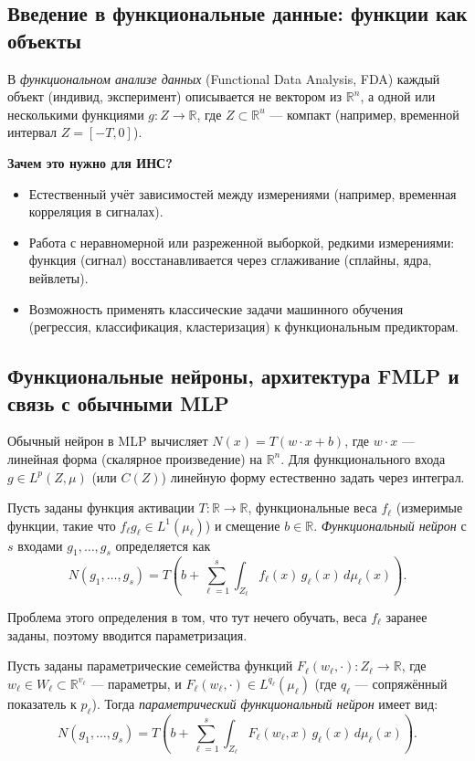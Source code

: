 \documentclass[../NDCNNAI_main.tex]{subfiles}
\begin{document}
	\subsection{Введение в функциональные данные: функции как объекты}
	
	В \emph{функциональном анализе данных} (Functional Data Analysis, FDA) каждый объект (индивид, эксперимент) описывается не вектором из $\mathbb{R}^n$, а одной или несколькими функциями $g\colon Z \to \mathbb{R}$, где $Z \subset \mathbb{R}^u$ --- компакт (например, временной интервал $Z = [-T, 0]$).
	
	\textbf{Зачем это нужно для ИНС?}
	\begin{itemize}
		\item Естественный учёт зависимостей между измерениями (например, временная корреляция в сигналах).
		\item Работа с неравномерной или разреженной выборкой, редкими измерениями: функция (сигнал) восстанавливается через сглаживание (сплайны, ядра, вейвлеты).
		\item Возможность применять классические задачи машинного обучения (регрессия, классификация, кластеризация) к функциональным предикторам.
	\end{itemize}
	
	
	\subsection{Функциональные нейроны, архитектура FMLP и связь с обычными MLP}
	
	Обычный нейрон в MLP вычисляет $N(x) = T(w \cdot x + b)$, где $w \cdot x$ --- линейная форма (скалярное произведение) на $\mathbb{R}^n$. Для функционального входа $g \in L^p(Z, \mu)$ (или $C(Z)$) линейную форму естественно задать через интеграл.
	
	\begin{definition}
		Пусть заданы функция активации $T\colon \mathbb{R} \to \mathbb{R}$, функциональные веса $f_\ell$ (измеримые функции, такие что $f_\ell g_\ell \in L^1(\mu_\ell)$) и смещение $b \in \mathbb{R}$. \emph{Функциональный нейрон} с $s$ входами $g_1,\dots,g_s$ определяется как
		\[
		N(g_1,\dots,g_s) = T\left( b + \sum_{\ell=1}^s \int_{Z_\ell} f_\ell(x) \, g_\ell(x) \, d\mu_\ell(x) \right).
		\]
	\end{definition}
	Проблема этого определения в том, что тут нечего обучать, веса $f_\ell$ заранее заданы, поэтому вводится параметризация.
	\begin{definition}
		Пусть заданы параметрические семейства функций $F_\ell(w_\ell, \cdot)\colon Z_\ell \to \mathbb{R}$, где $w_\ell \in W_\ell \subset \mathbb{R}^{v_\ell}$ --- параметры, и $F_\ell(w_\ell, \cdot) \in L^{q_\ell}(\mu_\ell)$ (где $q_\ell$ --- сопряжённый показатель к $p_\ell$). Тогда \emph{параметрический функциональный нейрон} имеет вид:
		\[
		N(g_1,\dots,g_s) = T\left( b + \sum_{\ell=1}^s \int_{Z_\ell} F_\ell(w_\ell, x) \, g_\ell(x) \, d\mu_\ell(x) \right).
		\]
	\end{definition}
	
\end{document}
